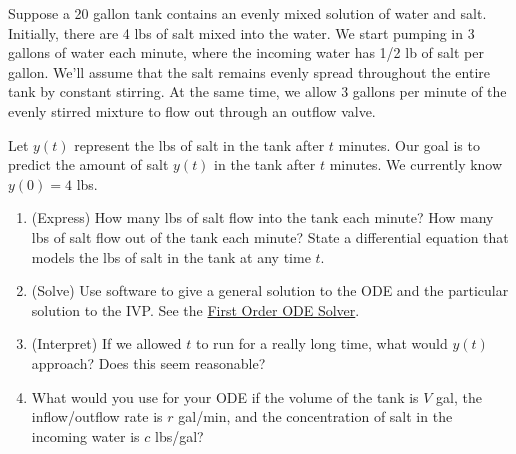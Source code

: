 \begin{problem}
Suppose a 20 gallon tank contains an evenly mixed solution of water and salt. Initially, there are 4 lbs of salt mixed into the water. 
We start pumping in 3 gallons of water each minute, where the incoming water has 1/2 lb of salt per gallon. We'll assume that the salt remains evenly spread throughout the entire tank by constant stirring.  
At the same time, we allow 3 gallons per minute of the evenly stirred mixture to flow out through an outflow valve. 

Let $y(t)$ represent the lbs of salt in the tank after $t$ minutes. Our goal is to predict the amount of salt $y(t)$ in the tank after $t$ minutes. We currently know $y(0)=4$ lbs. 
\begin{enumerate}
 \item 
{}%
(Express) 
How many lbs of salt flow into the tank each minute? 
How many lbs of salt flow out of the tank each minute? 
State a differential equation that models the lbs of salt in the tank at any time $t$. 
 \item 
(Solve) 
Use software to give a general solution to the ODE and the particular solution to the IVP. See the \href{\urlfirstorderodesolver}{First Order ODE Solver}.
 \item 
(Interpret) 
If we allowed $t$ to run for a really long time, what would $y(t)$ approach? Does this seem reasonable?
 \item What would you use for your ODE if the volume of the tank is $V$ gal, the inflow/outflow rate is $r$ gal/min, and the concentration of salt in the incoming water is $c$ lbs/gal?
\end{enumerate}
\end{problem}


